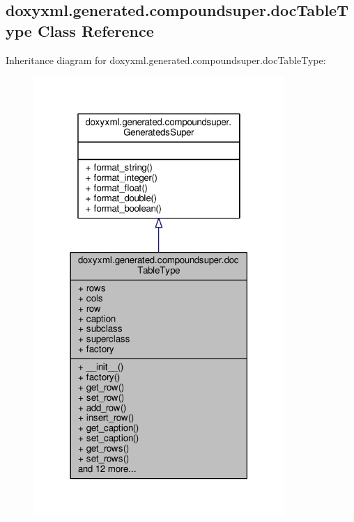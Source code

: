 \subsection{doxyxml.\+generated.\+compoundsuper.\+doc\+Table\+Type Class Reference}
\label{classdoxyxml_1_1generated_1_1compoundsuper_1_1docTableType}


Inheritance diagram for doxyxml.\+generated.\+compoundsuper.\+doc\+Table\+Type\+:
\nopagebreak
\begin{figure}[H]
\begin{center}
\leavevmode
\includegraphics[width=270pt]{de/d04/classdoxyxml_1_1generated_1_1compoundsuper_1_1docTableType__inherit__graph}
\end{center}
\end{figure}


